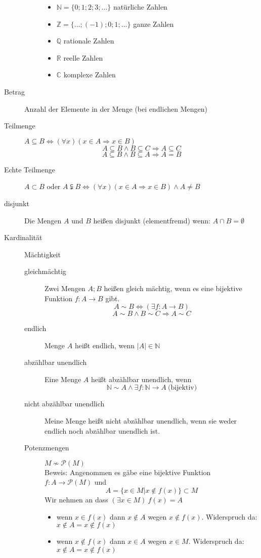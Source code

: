 \documentclass[12pt,a4paper]{article}
\begin{document}
\begin{description}
\begin{description}
					\begin{itemize}
						\item $\mathbb{N} = \lbrace 0;1;2;3;\dots \rbrace$ natürliche Zahlen
						\item $\mathbb{Z} = \lbrace \dots; (-1);0;1;\dots \rbrace$ ganze Zahlen
						\item $\mathbb{Q}$ rationale Zahlen
						\item $\mathbb{R}$ reelle Zahlen
						\item $\mathbb{C}$ komplexe Zahlen
					\end{itemize}
			\end{description}
		\item[Betrag] Anzahl der Elemente in der Menge (bei endlichen Mengen)
		\item[Teilmenge] $A \subseteq B \Leftrightarrow (\forall x)(x \in A \Rightarrow x \in B)$
			$$A \subseteq B \wedge B \subseteq C \Rightarrow A \subseteq C$$
			$$A \subseteq B \wedge B \subseteq A \Rightarrow A = B$$
		\item[Echte Teilmenge] $A \subset B$ oder $A \subsetneqq B \Leftrightarrow (\forall x)(x \in A \Rightarrow x \in B) \wedge A \not = B $
		\item[disjunkt] Die Mengen $A$ und $B$ heißen disjunkt (elementfremd) wenn: $A \cap B = \emptyset$
		\item[Kardinalität] Mächtigkeit
			\begin{description}
				\item[gleichmächtig] Zwei Mengen $A;B$ heißen gleich mächtig, wenn es eine bijektive Funktion $f : A \longrightarrow B$ gibt.
					$$A \sim B \Leftrightarrow (\exists f : A \longrightarrow B)$$
					$$A \sim B \wedge B \sim C \Rightarrow A \sim C$$
				\item[endlich] Menge $A$ heißt endlich, wenn $|A| \in \mathbb{N}$
				\item[abzählbar unendlich ] Eine Menge $A$ heißt abzählbar unendlich, wenn $$\mathbb{N} \sim A \wedge \exists f : \mathbb{N} \longrightarrow A\ \textrm{(bijektiv)}$$
				\item[nicht abzählbar unendlich] Meine Menge heißt nicht abzählbar unendlich, wenn sie weder endlich noch abzählbar unendlich ist.
				\item[Potenzmengen]$M \not \sim \mathcal{P}(M)$\\ Beweis:
					Angenommen es gäbe eine bijektive Funktion $f : A \longrightarrow \mathcal{P}(M)$ und
						$$A = \lbrace x \in M | x \not \in f(x) \rbrace \subset M$$
						Wir nehmen an dass $(\exists x \in M)\ f(x) = A$
						\begin{itemize}
							\item wenn $x \in f(x) $ dann $x \not \in A$ wegen $x \not \in f(x)$. Widerspruch da: $x \not \in A = x \not \in f(x)$
							\item wenn $x \not \in f(x)$ dann $x \in A$ wegen $x \in M$. Widerspruch da: $x \not \in A = x \not \in f(x)$ 
						\end{itemize}
			\end{description}			 
	\end{description}
	
\end{document}
